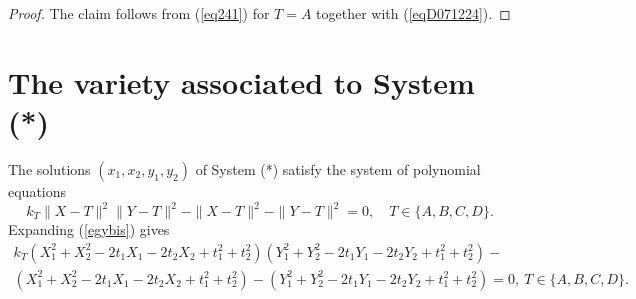 \documentclass[10pt]{amsart}
\newtheorem{lem}[thm]{Lemma}
\theoremstyle{definition}
\theoremstyle{remark}
\begin{document}
\begin{proof} The claim follows from (\ref{eq241}) for $T=A$ together with (\ref{eqD071224}).
\end{proof}
\section{The variety associated to System (*)}
The solutions $(x_1,x_2,y_1,y_2)$ of System (*) satisfy the system of polynomial equations
\begin{equation}
\label{egybis}
k_T \|X-T\|^2\|Y-T\|^2-\|X-T\|^2-\|Y-T\|^2=0,\quad T\in\{A,B,C,D\}.
\end{equation}
Expanding (\ref{egybis}) gives
\begin{equation}
\label{egybisA}
\begin{array}{l}
     k_T (X_1^2+X_2^2-2t_1X_1-2t_2X_2+t_1^2+t_2^2)(Y_1^2+Y_2^2-2t_1Y_1-2t_2Y_2+t_1^2+t_2^2)-  \\
     (X_1^2+X_2^2-2t_1X_1-2t_2X_2+t_1^2+t_2^2)-(Y_1^2+Y_2^2-2t_1Y_1-2t_2Y_2+t_1^2+t_2^2)=0,\  T\in\{A,B,C,D\}.
\end{array}
\end{equation}
\end{document}
